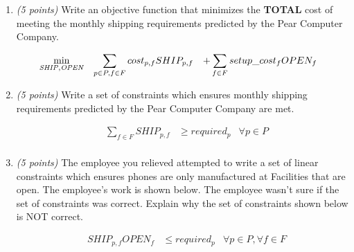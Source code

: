 \documentclass[10pt]{article}
\begin{document}
\begin{center}
\begin{enumerate}
\item {\it (5 points)} Write an objective function that minimizes the {\bf TOTAL} cost of meeting the monthly shipping requirements predicted by the Pear Computer Company.

\[
    \begin{array}{llll}
      \displaystyle\min_{ \tiny{\it SHIP, OPEN}} & \displaystyle\sum_{p\in P, f\in F} cost_{p,f} SHIP_{p,f} & + \displaystyle\sum_{f\in F} setup\_cost_f OPEN_f & \\
    \end{array}
    \]

\item {\it (5 points)} Write a set of constraints which ensures monthly shipping requirements predicted by the Pear Computer Company are met. 

\[
    \begin{array}{llll}
    & \displaystyle\sum_{f\in F} SHIP_{p,f} & \ge required_p & \forall p \in P \\
    \end{array}
    \]

\item {\it (5 points)} The employee you relieved attempted to write a set of linear constraints which ensures phones are only manufactured at Facilities that are open.  The employee's work is shown below.  The employee wasn't sure if the set of constraints was correct.  Explain why the set of constraints shown below is NOT correct.

\[
    \begin{array}{llll}
    & SHIP_{p,f} OPEN_f & \le required_p & \forall p \in P, \forall f \in F \\
    \end{array}
    \]


\end{enumerate}

\end{center}
\end{document}
